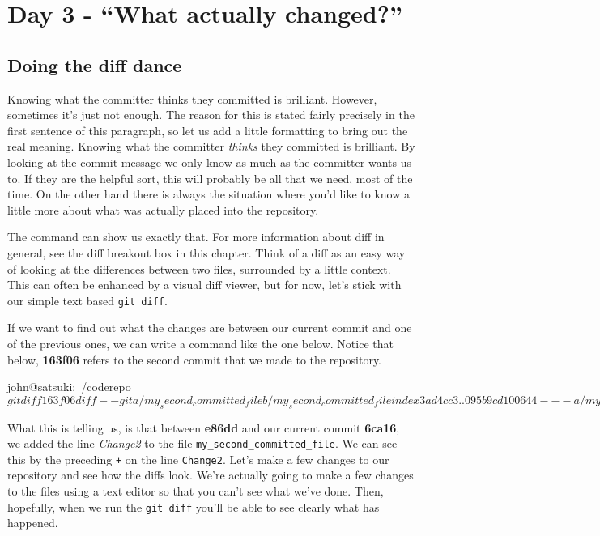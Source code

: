 \section{Day 3 - ``What actually changed?''}
\subsection{Doing the diff dance}

Knowing what the committer thinks they committed is brilliant.
However, sometimes it's just not enough.
The reason for this is stated fairly precisely in the first sentence of this paragraph, so let us add a little formatting to bring out the real meaning.
Knowing what the committer \emph{thinks} they committed is brilliant.
By looking at the commit message we only know as much as the committer wants us to.
If they are the helpful sort, this will probably be all that we need, most of the time.
On the other hand there is always the situation where you'd like to know a little more about what was actually placed into the repository.

The  command can show us exactly that.
For more information about diff in general, see the diff breakout box in this chapter.
Think of a diff as an easy way of looking at the differences between two files, surrounded by a little context.
This can often be enhanced by a visual diff viewer, but for now, let's stick with our simple text based \texttt{git diff}.

If we want to find out what the changes are between our current commit and one of the previous ones, we can write a command like the one below.
Notice that below, \textbf{163f06} refers to the second commit that we made to the repository.

\begin{code}
john@satsuki:~/coderepo$ git diff 163f06
diff --git a/my_second_committed_file b/my_second_committed_file
index 3ad4cc3..095b9cd 100644
--- a/my_second_committed_file
+++ b/my_second_committed_file
@@ -1 +1,2 @@
 Change1
+Change2
john@satsuki:~/coderepo$
\end{code}

What this is telling us, is that between \textbf{e86dd} and our current commit \textbf{6ca16}, we added the line \emph{Change2} to the file \texttt{my\_second\_committed\_file}.
We can see this by the preceding \texttt{+} on the line \texttt{Change2}.
Let's make a few changes to our repository and see how the diffs look.
We're actually going to make a few changes to the files using a text editor so that you can't see what we've done.
Then, hopefully, when we run the \texttt{git diff} you'll be able to see clearly what has happened.


